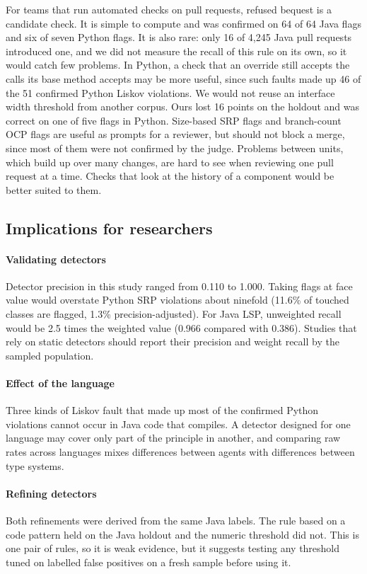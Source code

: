 \documentclass[sigconf]{acmart}
\begin{document}
For teams that run automated checks on pull requests, refused bequest is a candidate check. It is
simple to compute and was confirmed on 64 of 64 Java flags and six of seven Python flags. It is also
rare: only 16 of 4,245 Java pull requests introduced one, and we did not measure the recall of this
rule on its own, so it would catch few problems. In Python, a check that an override still accepts
the calls its base method accepts may be more useful, since such faults made up 46 of the 51
confirmed Python Liskov violations. We would not reuse an interface width threshold from another
corpus. Ours lost 16 points on the holdout and was correct on one of five
flags in Python. Size-based SRP flags and branch-count OCP flags are useful as prompts for a
reviewer, but should not block a merge, since most of them were not confirmed by the judge. Problems
between units, which build up over many changes, are hard to see when reviewing one pull request at a
time. Checks that look at the history of a component would be better suited to them.

\subsection{Implications for researchers}

\paragraph{Validating detectors} Detector precision in this study ranged from 0.110 to 1.000. Taking
flags at face value would overstate Python SRP violations about ninefold (11.6\% of touched classes
are flagged, 1.3\% precision-adjusted). For Java LSP, unweighted recall would be 2.5 times the weighted
value (0.966 compared with 0.386). Studies that rely on static detectors should report their
precision and weight recall by the sampled population.

\paragraph{Effect of the language} Three kinds of Liskov fault that made up most of the confirmed
Python violations cannot occur in Java code that compiles. A detector designed for one language may
cover only part of the principle in another, and comparing raw rates across languages mixes differences between agents with
differences between type systems.

\paragraph{Refining detectors} Both refinements were derived from the same Java labels. The rule
based on a code pattern held on the Java holdout and the numeric threshold did not. This is one pair
of rules, so it is weak evidence, but it suggests testing any threshold tuned on labelled false
positives on a fresh sample before using it.
\end{document}

